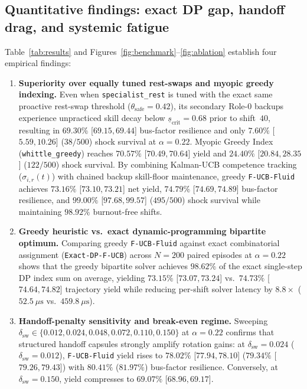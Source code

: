 \documentclass[11pt]{article}
\begin{document}
\subsection{Quantitative findings: exact DP gap, handoff drag, and systemic fatigue}

Table~\ref{tab:results} and Figures~\ref{fig:benchmark}--\ref{fig:ablation} establish four empirical findings:
\begin{enumerate}
  \item \textbf{Superiority over equally tuned rest-swaps and myopic greedy indexing.} Even when \texttt{specialist\_\linebreak[0]rest} is tuned with the exact same proactive rest-swap threshold ($\theta_{\mathrm{safe}} = 0.42$), its secondary Role-0 backups experience unpracticed skill decay below $\underline{s}_{\mathrm{crit}} = 0.68$ prior to shift~$40$, resulting in $69.30\%$ [$69.15, 69.44$] bus-factor resilience and only $7.60\%$ [$5.59, 10.26$] ($38/500$) shock survival at $\alpha=0.22$. Myopic Greedy Index (\texttt{whittle\_\linebreak[0]greedy}) reaches $70.57\%$ [$70.49, 70.64$] yield and $24.40\%$ [$20.84, 28.35$] ($122/500$) shock survival. By combining Kalman-UCB competence tracking ($\sigma_{i,r}(t)$) with chained backup skill-floor maintenance, greedy \texttt{F-UCB-Fluid} achieves $73.16\%$ [$73.10, 73.21$] net yield, $74.79\%$ [$74.69, 74.89$] bus-factor resilience, and $99.00\%$ [$97.68, 99.57$] ($495/500$) shock survival while maintaining $98.92\%$ burnout-free shifts.
  \item \textbf{Greedy heuristic vs.\ exact dynamic-programming bipartite optimum.} Comparing greedy \texttt{F-UCB-Fluid} against exact combinatorial assignment (\texttt{Exact-DP-F-UCB}) across $N=200$ paired episodes at $\alpha=0.22$ shows that the greedy bipartite solver achieves $98.62\%$ of the exact single-step DP index sum on average, yielding $73.15\%$ [$73.07, 73.24$] vs.\ $74.73\%$ [$74.64, 74.82$] trajectory yield while reducing per-shift solver latency by $8.8\times$ ($52.5~\mu\mathrm{s}$ vs.\ $459.8~\mu\mathrm{s}$).
  \item \textbf{Handoff-penalty sensitivity and break-even regime.} Sweeping $\delta_{\mathrm{sw}} \allowbreak \in \{0.012,\allowbreak 0.024,\allowbreak 0.048,\allowbreak 0.072,\allowbreak 0.110,\allowbreak 0.150\}$ at $\alpha=0.22$ confirms that structured handoff capsules \citep{das2026safecontext} strongly amplify rotation gains: at $\delta_{\mathrm{sw}} = 0.024$ ($\delta_{\mathrm{sw}} = 0.012$), \texttt{F-UCB-Fluid} yield rises to $78.02\%$ [$77.94, 78.10$] ($79.34\%$ [$79.26, 79.43$]) with $80.41\%$ ($81.97\%$) bus-factor resilience. Conversely, at $\delta_{\mathrm{sw}} = 0.150$, yield compresses to $69.07\%$ [$68.96, 69.17$].

\end{enumerate}
\end{document}

